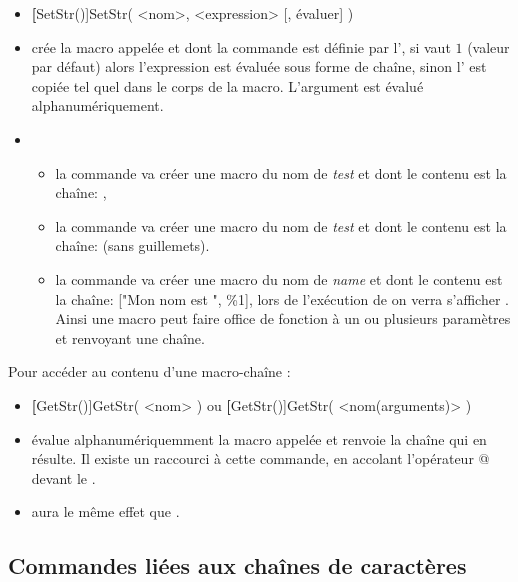 \begin{itemize}
 \item \textbf[SetStr()]{SetStr( <nom>, <expression> [, évaluer] )} 

\item \desc crée la macro appelée  et dont la commande est définie par l', si  vaut $1$ (valeur par défaut) alors l'expression est évaluée sous forme de chaîne, sinon l' est copiée tel quel dans le corps de la macro. L'argument  est évalué alphanumériquement.
\item \exem 
  \begin{itemize}
    \item la commande  va créer une macro du nom de \textit{test} et dont le contenu est la chaîne: ,
    \item la commande  va créer une macro du nom de \textit{test} et dont le contenu est la chaîne:  (sans guillemets).
    \item la commande  va créer une macro du nom de \textit{name} et dont le contenu est la chaîne: ["Mon nom est ", \%1], lors de l'exécution de  on verra s'afficher . Ainsi une macro peut faire office de fonction à un ou plusieurs paramètres et renvoyant une chaîne.
    \end{itemize}
\end{itemize}

Pour accéder au contenu d'une macro-chaîne :

\begin{itemize}
\item \textbf[GetStr()]{GetStr( <nom> )} ou \textbf[GetStr()]{GetStr( <nom(arguments)> )}

\item \desc évalue alphanumériquemment la macro appelée  et renvoie la chaîne qui en résulte. Il existe un raccourci à cette commande, en accolant l'opérateur @ devant le .
\item \exem {} aura le même effet que .
\end{itemize}


\subsection{Commandes liées aux chaînes de caractères}

